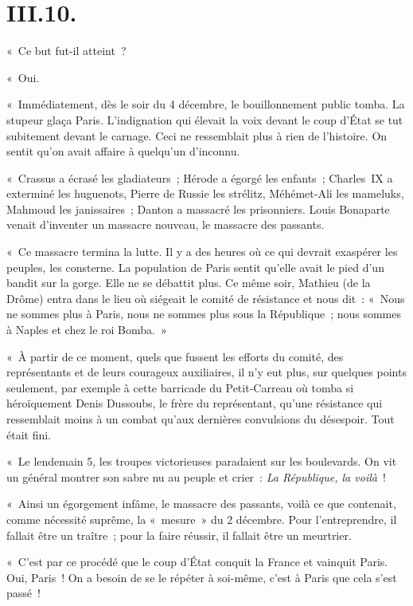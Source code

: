 \documentclass[french,twoside]{book} %
\begin{document}
\section[{III.10.}]{III.10.}

« Ce but fut-il atteint ?\par
« Oui.\par
« Immédiatement, dès le soir du 4 décembre, le bouillonnement public tomba. La stupeur glaça Paris. L’indignation qui élevait la voix devant le coup d’État se tut subitement devant le carnage. Ceci ne ressemblait plus à rien de l’histoire. On sentit qu’on avait affaire à quelqu’un d’inconnu.\par
« Crassus a écrasé les gladiateurs ; Hérode a égorgé les enfants ; Charles IX a exterminé les huguenots, Pierre de Russie les strélitz, Méhémet-Ali les mameluks, Mahmoud les janissaires ; Danton a massacré les prisonniers. Louis Bonaparte venait d’inventer un massacre nouveau, le massacre des passants.\par
« Ce massacre termina la lutte. Il y a des heures où ce qui devrait exaspérer les peuples, les consterne. La population de Paris sentit qu’elle avait le pied d’un bandit sur la gorge. Elle ne se débattit plus. Ce même soir, Mathieu (de la Drôme) entra dans le lieu où siégeait le comité de résistance et nous dit : « Nous ne sommes plus à Paris, nous ne sommes plus sous la République ; nous sommes à Naples et chez le roi Bomba. »\par
« À partir de ce moment, quels que fussent les efforts du comité, des représentants et de leurs courageux auxiliaires, il n’y eut plus, sur quelques points seulement, par exemple à cette barricade du Petit-Carreau où tomba si héroïquement Denis Dussoubs, le frère du représentant, qu’une résistance qui ressemblait moins à un combat qu’aux dernières convulsions du désespoir. Tout était fini.\par
« Le lendemain 5, les troupes victorieuses paradaient sur les boulevards. On vit un général montrer son sabre nu au peuple et crier : \emph{La République, la voilà} !\par
« Ainsi un égorgement infâme, le massacre des passants, voilà ce que contenait, comme nécessité suprême, la « mesure » du 2 décembre. Pour l’entreprendre, il fallait être un traître ; pour la faire réussir, il fallait être un meurtrier.\par
« C’est par ce procédé que le coup d’État conquit la France et vainquit Paris. Oui, Paris ! On a besoin de se le répéter à soi-même, c’est à Paris que cela s’est passé !\par
\end{document}
